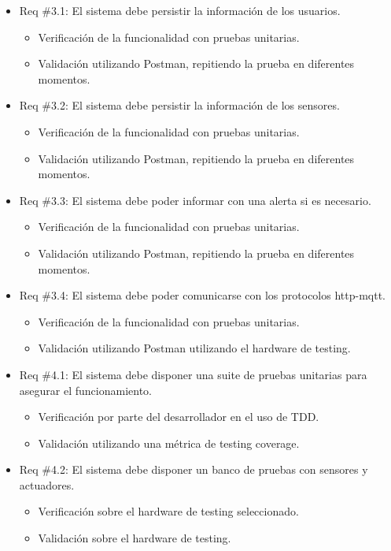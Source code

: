 \documentclass[
11pt, %
]{charter}
\begin{document}
\begin{itemize}
\item Req \#3.1: El sistema debe persistir la información de los usuarios.
\begin{itemize}
	\item  Verificación de la funcionalidad con pruebas unitarias.
	\item Validación utilizando Postman, repitiendo la prueba en diferentes momentos.
\end{itemize}

\item Req \#3.2: El sistema debe persistir la información de los sensores.
\begin{itemize}
	\item  Verificación de la funcionalidad con pruebas unitarias.
	\item  Validación utilizando Postman, repitiendo la prueba en diferentes momentos.
\end{itemize}

\item Req \#3.3: El sistema debe poder informar con una alerta si es necesario.
\begin{itemize}
	\item  Verificación de la funcionalidad con pruebas unitarias.
	\item Validación utilizando Postman, repitiendo la prueba en diferentes momentos.
\end{itemize}

\item Req \#3.4: El sistema debe poder comunicarse con los protocolos http-mqtt.
\begin{itemize}
	\item  Verificación de la funcionalidad con pruebas unitarias.
	\item Validación utilizando Postman utilizando el hardware de testing.
\end{itemize}

\item Req \#4.1: El sistema debe disponer una suite de pruebas unitarias para asegurar el funcionamiento.
\begin{itemize}
	\item  Verificación por parte del desarrollador en el uso de TDD.
	\item Validación utilizando una métrica de testing coverage.
\end{itemize}

\item Req \#4.2: El sistema debe disponer un banco de pruebas con sensores y actuadores.
\begin{itemize}
	\item  Verificación sobre el hardware de testing seleccionado.
	\item Validación sobre el hardware de testing.
\end{itemize}


\end{itemize}
\end{document}
